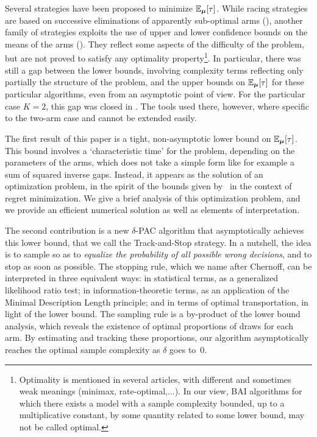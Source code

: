 \documentclass{colt2016} %
\begin{document}
Several strategies have been proposed to minimize $\mathbb{E}_{\bm \mu}[\tau]$. While racing strategies are based on successive eliminations of apparently sub-optimal arms (\cite{EvenDaral06,COLT13}), another family of strategies exploits the use of upper and lower confidence bounds on the means of the arms (\cite{Shivaramal12,Gabillon:al12,COLT13,Jamiesonal14LILUCB}). 
They reflect some aspects of the difficulty of the problem, but are not proved to satisfy any optimality property\footnote{Optimality is mentioned in several articles, with different and sometimes weak meanings (minimax, rate-optimal,...). In our view, BAI algorithms for which there exists a model with a sample complexity bounded, up to a multiplicative constant, by some quantity related to some lower bound, may not be called  optimal.}. In particular, there was still a gap between the lower bounds, involving complexity terms reflecting only partially the structure of the problem, and the upper bounds on $\mathbb{E}_{\bm \mu}[\tau]$ for these particular algorithms, even from an asymptotic point of view. For the particular case $K=2$, this gap was closed in \cite{COLT14}. The tools used there, however, where specific to the two-arm case and cannot be extended easily.

The first result of this paper is a tight, non-asymptotic lower bound on $\mathbb{E}_{\bm \mu}[\tau]$. 
This bound involves a `characteristic time' for the problem, depending on the parameters of the arms, which does not take a simple form like for example a sum of squared inverse gaps. Instead, it appears as the solution of an optimization problem, in the spirit of the bounds given by~\cite{GravesLai97} in the context of regret minimization.
We give a brief analysis of this optimization problem, and we provide an efficient numerical solution as well as elements of interpretation. %

The second contribution is a new $\delta$-PAC algorithm that asymptotically achieves this lower bound, that we call the Track-and-Stop strategy.
In a nutshell, the idea is to sample so as to \emph{equalize the probability of all possible wrong decisions}, and to stop as soon as possible. The stopping rule, which we name after Chernoff, can be interpreted in three equivalent ways: in statistical terms, as a generalized likelihood ratio test; in information-theoretic terms, as an application of the Minimal Description Length principle; and in terms of optimal transportation, in light of the lower bound. The sampling rule is a by-product of the lower bound analysis, which reveals the existence of optimal proportions of draws for each arm. By estimating and tracking these proportions, our algorithm asymptotically reaches the optimal sample complexity as $\delta$ goes to~$0$.
\end{document}
